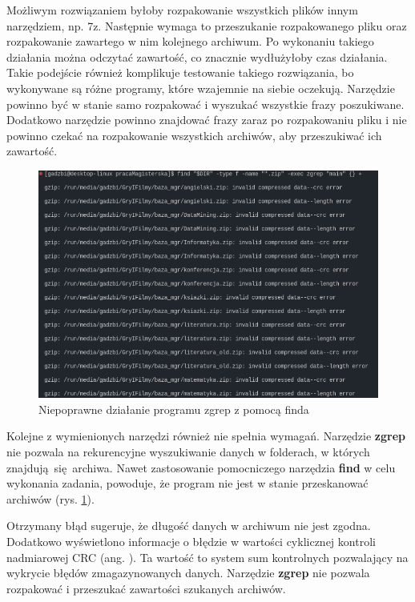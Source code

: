 Możliwym rozwiązaniem byłoby rozpakowanie wszystkich plików innym narzędziem, np.
7z. Następnie wymaga to przeszukanie rozpakowanego pliku oraz rozpakowanie 
zawartego w nim kolejnego archiwum. Po wykonaniu takiego działania można 
odczytać zawartość, co znacznie wydłużyłoby czas działania. Takie podejście również
komplikuje testowanie takiego rozwiązania, bo wykonywane są różne programy, 
które wzajemnie na siebie oczekują. Narzędzie powinno być w stanie samo 
rozpakować i wyszukać wszystkie frazy poszukiwane. Dodatkowo narzędzie powinno
znajdować frazy zaraz po rozpakowaniu pliku i nie powinno czekać na rozpakowanie
wszystkich archiwów, aby przeszukiwać ich zawartość.

\begin{figure}[htbp]
\centering
\includegraphics[width=1.0\textwidth]{./images/zgrep-errors.png}
\caption{Niepoprawne działanie programu zgrep z pomocą finda}
\label{fig:zgrepErrors}
\end{figure}

Kolejne z wymienionych narzędzi również nie spełnia wymagań. Narzędzie \textbf{zgrep} nie pozwala
na rekurencyjne wyszukiwanie danych w folderach, w których znajdują się archiwa.
Nawet zastosowanie pomocniczego narzędzia \textbf{find} w celu wykonania zadania,
powoduje, że program nie jest w stanie przeskanować archiwów (rys. \ref{fig:zgrepErrors}).

Otrzymany błąd sugeruje, że długość danych w archiwum nie jest zgodna. Dodatkowo
wyświetlono informacje o błędzie w wartości cyklicznej kontroli nadmiarowej CRC
(ang. ). Ta wartość to system sum kontrolnych
pozwalający na wykrycie błędów zmagazynowanych danych. Narzędzie \textbf{zgrep} nie pozwala 
rozpakować i przeszukać zawartości szukanych archiwów.

